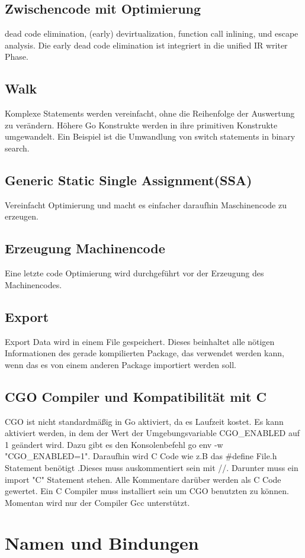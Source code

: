 \subsection{Zwischencode mit Optimierung}
dead code elimination, (early) devirtualization, function call inlining, und escape analysis.
Die early dead code elimination ist integriert in die unified IR writer Phase.
\subsection{Walk}
Komplexe Statements werden vereinfacht, ohne die Reihenfolge der Auswertung zu verändern. Höhere Go Konstrukte werden in ihre primitiven Konstrukte  umgewandelt. Ein Beispiel ist die Umwandlung von switch statements in binary search.
\subsection{Generic Static Single Assignment(SSA)}
Vereinfacht Optimierung und macht es einfacher daraufhin Maschinencode zu erzeugen.
\subsection{Erzeugung Machinencode}
Eine letzte code Optimierung wird durchgeführt vor der Erzeugung des Machinencodes.
\subsection{Export}
Export Data wird in einem File gespeichert. Dieses beinhaltet alle nötigen Informationen des gerade kompilierten Package, das verwendet werden kann, wenn das es von einem anderen Package importiert werden soll.
\subsection{CGO Compiler und Kompatibilität mit C} 
CGO ist nicht standardmäßig in Go aktiviert, da es Laufzeit kostet. Es kann aktiviert werden, in dem der Wert der Umgebungsvariable CGO\_ENABLED auf 1 geändert wird. Dazu gibt es den Konsolenbefehl go env -w "CGO\_ENABLED=1".
Daraufhin wird C Code wie z.B das \#define File.h Statement benötigt .Dieses muss auskommentiert sein mit //. Darunter muss ein import "C" Statement stehen. Alle Kommentare darüber werden als C Code gewertet. Ein C Compiler muss installiert sein um CGO benutzten zu können. Momentan wird nur der Compiler Gcc unterstützt.


\section{Namen und Bindungen}
